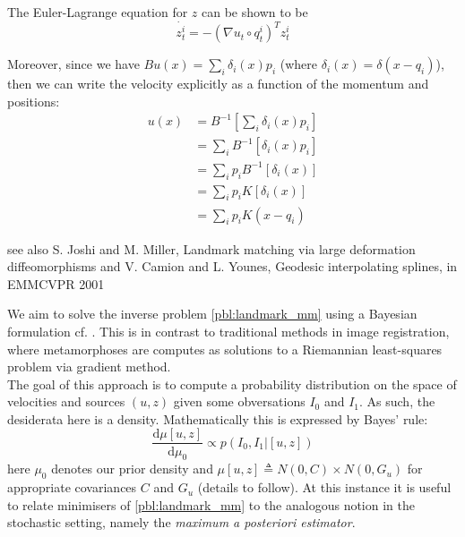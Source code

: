 \documentclass{article}
\newcommand{\dd}[2]{\frac{\diff#1}{\diff#2}}
\newcommand{\diff}[1]{\text{d} #1}
\begin{document}
The Euler-Lagrange equation for $z$ can be shown to be
\begin{equation}\label{eq:ele_z}
\dot{z^i_t} = - (\nabla u_t \circ q^i_t)^T z^i_t
\end{equation}

Moreover, since we have $Bu(x) = \sum_i \delta_i(x) p_i$ (where $\delta_i(x) =
\delta(x-q_i)$), then we can write the velocity explicitly as a function of
the momentum and positions:
\begin{align*}
u (x) & = B^{-1} [\sum_i \delta_i(x) p_i]\\
& = \sum_i B^{-1} [\delta_i(x) p_i]\\
& = \sum_i p_i B^{-1} [\delta_i(x)]\\
& = \sum_i p_i K[\delta_i(x)]\\
& = \sum_i p_i K(x - q_i)
\end{align*}

see also S. Joshi and M. Miller, Landmark matching via large deformation
diffeomorphisms and V. Camion and L. Younes, Geodesic interpolating splines,
in EMMCVPR 2001

We aim to solve the inverse problem \eqref{pbl:landmark_mm} using a Bayesian
formulation cf. \cite{dashti2017bayesian,dashti2013map}. This is in contrast to
traditional methods in image registration, where metamorphoses are computes as
solutions to a Riemannian least-squares problem via gradient method.\\

The goal of this approach is to compute a probability distribution on the space
of velocities and sources $(u,z)$ given some obversations $I_0$ and $I_1$. As
such, the desiderata here is a density. Mathematically this is expressed by
Bayes' rule:
\[
\dd{\mu[u,z]}{\mu_0} \propto p(I_0, I_1 | [u, z])
\]
here $\mu_0$ denotes our prior density and $\mu[u, z] \triangleq N(0,C)\times
N(0,G_u)$ for appropriate covariances $C$ and $G_u$ (details to follow). At this
instance it is useful to relate minimisers of \eqref{pbl:landmark_mm} to the
analogous notion in the stochastic setting, namely the \textit{maximum a
posteriori estimator}.
\end{document}
